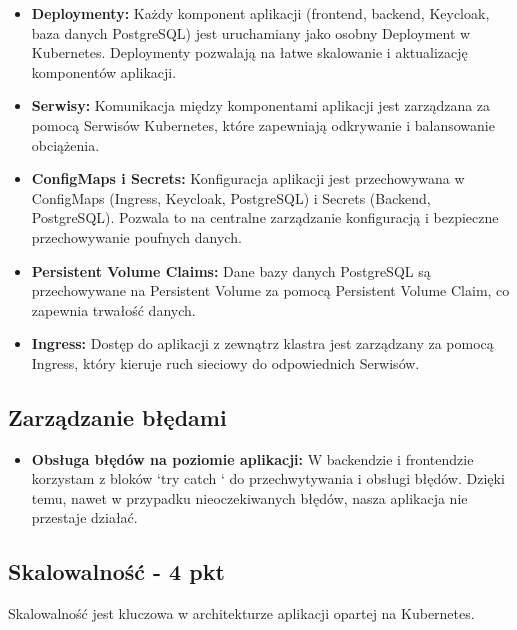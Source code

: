 \documentclass[12pt,a4paper]{article}
\begin{document}
\begin{itemize}
\item \textbf{Deploymenty:} Każdy komponent aplikacji (frontend, backend, Keycloak, baza danych PostgreSQL) jest uruchamiany jako osobny Deployment w Kubernetes. Deploymenty pozwalają na łatwe skalowanie i aktualizację komponentów aplikacji.

\item \textbf{Serwisy:} Komunikacja między komponentami aplikacji jest zarządzana za pomocą Serwisów Kubernetes, które zapewniają odkrywanie i balansowanie obciążenia.

\item \textbf{ConfigMaps i Secrets:} Konfiguracja aplikacji jest przechowywana w ConfigMaps (Ingress, Keycloak, PostgreSQL) i Secrets (Backend, PostgreSQL). Pozwala to na centralne zarządzanie konfiguracją i bezpieczne przechowywanie poufnych danych.

\item \textbf{Persistent Volume Claims:} Dane bazy danych PostgreSQL są przechowywane na Persistent Volume za pomocą Persistent Volume Claim, co zapewnia trwałość danych.

\item \textbf{Ingress:} Dostęp do aplikacji z zewnątrz klastra jest zarządzany za pomocą Ingress, który kieruje ruch sieciowy do odpowiednich Serwisów.
\end{itemize}

\subsection{Zarządzanie błędami}
\label{sec:ERD} 

\begin{itemize}
\item \textbf{Obsługa błędów na poziomie aplikacji:} W backendzie i frontendzie korzystam z bloków `try {} catch {}` do przechwytywania i obsługi błędów. Dzięki temu, nawet w przypadku nieoczekiwanych błędów, nasza aplikacja nie przestaje działać.

\end{itemize}

\subsection{Skalowalność - 4 pkt}
\label{sec:ExamplesSection}

Skalowalność jest kluczowa w architekturze aplikacji opartej na Kubernetes.
\end{document}
